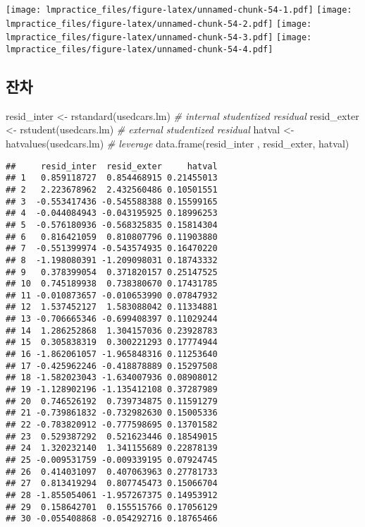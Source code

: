 \documentclass[
]{book}
\newenvironment{Shaded}{\begin{snugshade}}{\end{snugshade}}
\newcommand{\CommentTok}[1]{\textcolor[rgb]{0.56,0.35,0.01}{\textit{#1}}}
\newcommand{\FunctionTok}[1]{\textcolor[rgb]{0.00,0.00,0.00}{#1}}
\newcommand{\NormalTok}[1]{#1}
\newcommand{\OtherTok}[1]{\textcolor[rgb]{0.56,0.35,0.01}{#1}}
\begin{document}
\texttt{[image: lmpractice\_files/figure-latex/unnamed-chunk-54-1.pdf]} \texttt{[image: lmpractice\_files/figure-latex/unnamed-chunk-54-2.pdf]} \texttt{[image: lmpractice\_files/figure-latex/unnamed-chunk-54-3.pdf]} \texttt{[image: lmpractice\_files/figure-latex/unnamed-chunk-54-4.pdf]}

\hypertarget{uxc794uxcc28}{%
\subsection{잔차}\label{uxc794uxcc28}}

\begin{Shaded}
\begin{Highlighting}[]
\NormalTok{resid\_inter }\OtherTok{\textless{}{-}} \FunctionTok{rstandard}\NormalTok{(usedcars.lm)  }\CommentTok{\# internal studentized residual}
\NormalTok{resid\_exter }\OtherTok{\textless{}{-}} \FunctionTok{rstudent}\NormalTok{(usedcars.lm)   }\CommentTok{\# external studentized residual}
\NormalTok{hatval }\OtherTok{\textless{}{-}} \FunctionTok{hatvalues}\NormalTok{(usedcars.lm)       }\CommentTok{\# leverage}
\FunctionTok{data.frame}\NormalTok{(resid\_inter , resid\_exter, hatval)}
\end{Highlighting}
\end{Shaded}

\begin{verbatim}
##     resid_inter  resid_exter     hatval
## 1   0.859118727  0.854468915 0.21455013
## 2   2.223678962  2.432560486 0.10501551
## 3  -0.553417436 -0.545588388 0.15599165
## 4  -0.044084943 -0.043195925 0.18996253
## 5  -0.576180936 -0.568325835 0.15814304
## 6   0.816421059  0.810807796 0.11903880
## 7  -0.551399974 -0.543574935 0.16470220
## 8  -1.198080391 -1.209098031 0.18743332
## 9   0.378399054  0.371820157 0.25147525
## 10  0.745189938  0.738380670 0.17431785
## 11 -0.010873657 -0.010653990 0.07847932
## 12  1.537452127  1.583088042 0.11334881
## 13 -0.706665346 -0.699408397 0.11029244
## 14  1.286252868  1.304157036 0.23928783
## 15  0.305838319  0.300221293 0.17774944
## 16 -1.862061057 -1.965848316 0.11253640
## 17 -0.425962246 -0.418878889 0.15297508
## 18 -1.582023043 -1.634007936 0.08908012
## 19 -1.128902196 -1.135412108 0.37287989
## 20  0.746526192  0.739734875 0.11591279
## 21 -0.739861832 -0.732982630 0.15005336
## 22 -0.783820912 -0.777598695 0.13701582
## 23  0.529387292  0.521623446 0.18549015
## 24  1.320232140  1.341155689 0.22878139
## 25 -0.009531759 -0.009339195 0.07924745
## 26  0.414031097  0.407063963 0.27781733
## 27  0.813419294  0.807745473 0.15066704
## 28 -1.855054061 -1.957267375 0.14953912
## 29  0.158642701  0.155515766 0.17056129
## 30 -0.055408868 -0.054292716 0.18765466
\end{verbatim}
\end{document}
